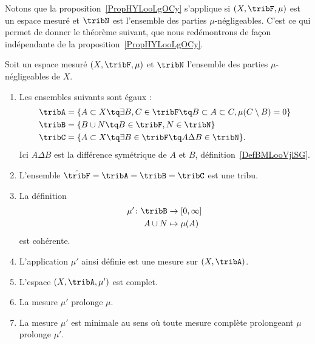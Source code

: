 Notons que la proposition~\ref{PropHYLooLgOCy} s'applique si \( (X,\tribF,\mu)\) est un espace mesuré et \( \tribN\) est l'ensemble des parties \( \mu\)-négligeables. C'est ce qui permet de donner le théorème suivant, que nous redémontrons de façon indépendante de la proposition~\ref{PropHYLooLgOCy}.
\begin{theorem}   \label{thoCRMootPojn}
    Soit un espace mesuré \( (X,\tribF,\mu)\) et \( \tribN\) l'ensemble des parties \( \mu\)-négligeables de \( X\).
    \begin{enumerate}
        \item
            Les ensembles suivants sont égaux :
            \begin{subequations}
                \begin{align}
                    \tribA&=\{ A\subset X\tq\exists B,C\in\tribF\tq B\subset A\subset C,\mu(C\setminus B)=0 \}\\
                    \tribB&=\{ B\cup N\tq  B\in\tribF,N\in\tribN \}    \label{EqFJIoorxZNU}\\
                    \tribC&=\{ A\subset X\tq \exists B\in\tribF\tq A\Delta B\in \tribN \}.
                \end{align}
            \end{subequations}
            Ici \( A\Delta B\) est la différence symétrique de \( A\) et \( B\), définition~\ref{DefBMLooVjlSG}.
        \item
            L'ensemble \( \hat\tribF=\tribA=\tribB=\tribC\) est une tribu.
        \item
            La définition
            \begin{equation}
                \begin{aligned}
                    \mu'\colon \tribB&\to \mathopen[ 0 , \infty \mathclose] \\
                    A\cup N&\mapsto \mu(A)
                \end{aligned}
            \end{equation}
            est cohérente.
        \item
            L'application \( \mu'\) ainsi définie est une mesure sur \( (X,\tribA)\).
        \item
            L'espace \( (X,\tribA,\mu')\) est complet.
        \item
            La mesure \( \mu'\) prolonge \( \mu\).
        \item   \label{thoCRMootPojnvii}
            La mesure \( \mu'\) est minimale au sens où toute mesure complète prolongeant \( \mu\) prolonge \( \mu'\).
    \end{enumerate}
\end{theorem}

